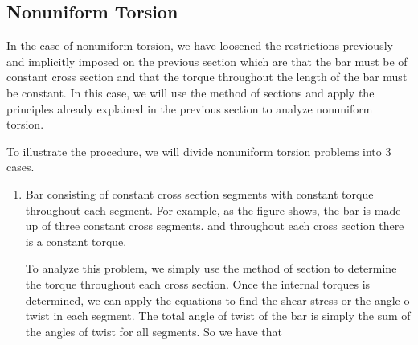 \documentclass[
10pt,
a4paper,
openany,
svgnames,
]{kaobook} %
\begin{document}
\subsection{Nonuniform Torsion}

In the case of nonuniform torsion, we have loosened the restrictions previously and implicitly imposed on the previous section which are that the bar must be of constant cross section and that the torque throughout the length of the bar must be constant. In this case, we will use the method of sections and apply the principles already explained in the previous section to analyze nonuniform torsion.

To illustrate the procedure, we will divide nonuniform torsion problems into 3 cases.

\begin{enumerate}
\item Bar consisting of constant cross section segments with constant torque throughout each segment. For example, as the figure shows, the bar is made up of three constant cross segments. and throughout each cross section there is a constant torque.
  
  To analyze this problem, we simply use the method of section to determine the torque throughout each cross section. Once the internal torques is determined, we can apply the equations to find the shear stress or the angle o twist in each segment. The total angle of twist of the bar is simply the sum of the angles of twist for all segments. So we have that

  \begin{figure}[h]
    \centering
  \end{figure}
  

\end{enumerate}
\end{document}
